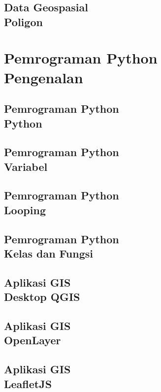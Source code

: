 \documentclass{WileySix}
\begin{document}
\chapter[Shapefile Poligon]
{Data Geospasial\\ Poligon}



\part[Pemrograman Python]
{Pemrograman Python\\ Pengenalan}

\chapter[Python]
{Pemrograman Python\\ Python}


\chapter[Variabel]
{Pemrograman Python\\ Variabel}



\chapter[Looping]
{Pemrograman Python\\ Looping}


\chapter[Kelas dan Fungsi]
{Pemrograman Python\\ Kelas dan Fungsi}



\chapter[QGIS]
{Aplikasi GIS\\ Desktop QGIS}


\chapter[OpenLayer]
{Aplikasi GIS\\ OpenLayer}


\chapter[LeafletJS]
{Aplikasi GIS\\ LeafletJS}









\printindex
\end{document}

